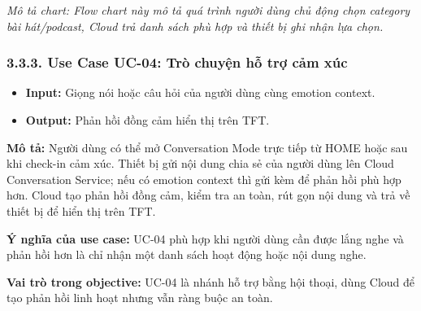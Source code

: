 \documentclass[12pt,a4paper]{article}
\begin{document}
\textit{Mô tả chart: Flow chart này mô tả quá trình người dùng chủ động chọn category bài hát/podcast, Cloud trả danh sách phù hợp và thiết bị ghi nhận lựa chọn.}


\subsubsection*{3.3.3. Use Case UC-04: Trò chuyện hỗ trợ cảm xúc}

\begin{itemize}
\item \textbf{Input:} Giọng nói hoặc câu hỏi của người dùng cùng emotion context.
\item \textbf{Output:} Phản hồi đồng cảm hiển thị trên TFT.
\end{itemize}

\textbf{Mô tả:} Người dùng có thể mở Conversation Mode trực tiếp từ HOME hoặc sau khi check-in cảm xúc. Thiết bị gửi nội dung chia sẻ của người dùng lên Cloud Conversation Service; nếu có emotion context thì gửi kèm để phản hồi phù hợp hơn. Cloud tạo phản hồi đồng cảm, kiểm tra an toàn, rút gọn nội dung và trả về thiết bị để hiển thị trên TFT.


\textbf{Ý nghĩa của use case:} UC-04 phù hợp khi người dùng cần được lắng nghe và phản hồi hơn là chỉ nhận một danh sách hoạt động hoặc nội dung nghe.


\textbf{Vai trò trong objective:} UC-04 là nhánh hỗ trợ bằng hội thoại, dùng Cloud để tạo phản hồi linh hoạt nhưng vẫn ràng buộc an toàn.
\end{document}
